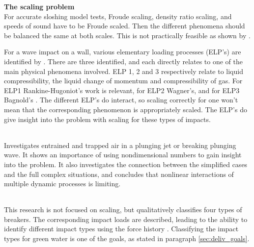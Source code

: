 \textbf{The scaling problem}\\
For accurate sloshing model tests, Froude scaling, density ratio scaling, and speeds of sound have to be Froude scaled. Then the different phenomena should be balanced the same at both scales. This is not practically feasible as shown by \citet{Braeunig2009}.\par 
For a wave impact on a wall, various elementary loading processes (ELP's) are identified by \citet{Lafeber2012b}. There are three identified, and each directly relates to one of the main physical phenomena involved. ELP 1, 2 and 3 respectively relate to liquid compressibility, the liquid change of momentum and compressibility of gas. For ELP1 Rankine-Hugoniot's work is relevant, for ELP2 Wagner's, and for ELP3 Bagnold's \cite{Dias2018}. The different ELP's do interact, so scaling correctly for one won't mean that the corresponding phenomenon is appropriately scaled. The ELP's do give insight into the problem with scaling for these types of impacts. 
\newline \par
\textbf{\citet{Kiger2011}}\\
\citet{Kiger2011} Investigates entrained and trapped air in a plunging jet or breaking plunging wave. It shows an importance of using nondimensional numbers to gain insight into the problem. It also investigates the connection between the simplified cases and the full complex situations, and concludes that nonlinear interactions of multiple dynamic processes is limiting.
\newline \par

\textbf{\citet{Oumeraci1993}}\\
This research is not focused on scaling, but qualitatively classifies
four types of breakers. The corresponding impact loads are described, leading to the ability to identify different impact types using the force history \cite{Oumeraci1993}. Classifying the impact types for green water is one of the goals, as stated in paragraph \ref{sec:deliv_goals}. 


